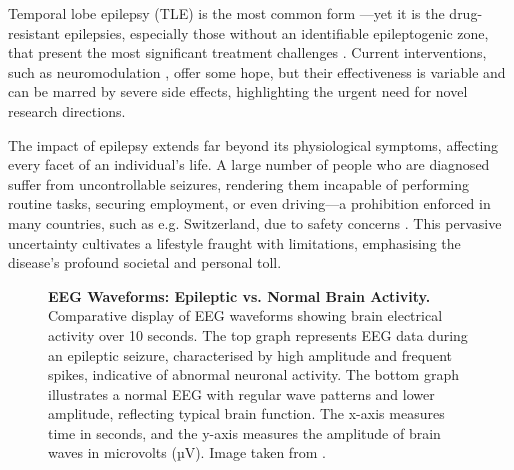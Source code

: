 \documentclass[10pt]{article}
\begin{document}
\begin{sloppypar}
  Temporal lobe epilepsy (TLE) is the most common form \citep{epilepsy_foundation_temporal_2019}—yet it is the drug-resistant epilepsies, especially those without an identifiable epileptogenic zone, that present the most significant treatment challenges \citep{iwasaki_non-invasive_2016, guery_clinical_2021}. Current interventions, such as neuromodulation \citep{fisher_electrical_2014}, offer some hope, but their effectiveness is variable and can be marred by severe side effects, highlighting the urgent need for novel research directions.

  The impact of epilepsy extends far beyond its physiological symptoms, affecting every facet of an individual's life. A large number of people who are diagnosed suffer from uncontrollable seizures, rendering them incapable of performing routine tasks, securing employment, or even driving—a prohibition enforced in many countries, such as e.g. Switzerland, due to safety concerns \citep{schweizerische_epilepsieliga_driving_2021}. This pervasive uncertainty cultivates a lifestyle fraught with limitations, emphasising the disease's profound societal and personal toll.

  \begin{figure}[ht]
    \centering
    \caption[EEG Waveforms: Epileptic vs. Normal Brain Activity]{\textbf{EEG Waveforms: Epileptic vs. Normal Brain Activity.} Comparative display of EEG waveforms showing brain electrical activity over 10 seconds. The top graph represents EEG data during an epileptic seizure, characterised by high amplitude and frequent spikes, indicative of abnormal neuronal activity. The bottom graph illustrates a normal EEG with regular wave patterns and lower amplitude, reflecting typical brain function. The x-axis measures time in seconds, and the y-axis measures the amplitude of brain waves in microvolts (µV). Image taken from \cite{espinosa_feedforward_2020}.}
    \label{fig:seizure-eeg}
  \end{figure}


\end{sloppypar}
\end{document}
